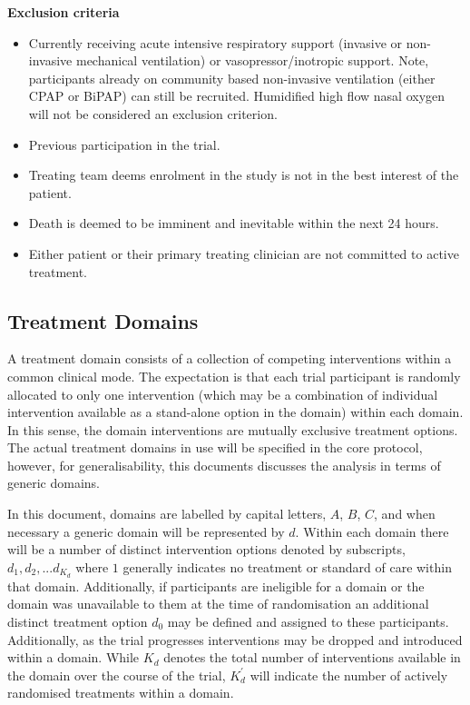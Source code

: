\documentclass[
  11pt,
]{article}
\providecommand{\tightlist}{%
  \setlength{\itemsep}{0pt}\setlength{\parskip}{0pt}}
\begin{document}
\textbf{Exclusion criteria}

\begin{itemize}
\tightlist
\item
  Currently receiving acute intensive respiratory support (invasive or non-invasive mechanical ventilation) or vasopressor/inotropic support. Note, participants already on community based non-invasive ventilation (either CPAP or BiPAP) can still be recruited. Humidified high flow nasal oxygen will not be considered an exclusion criterion.
\item
  Previous participation in the trial.
\item
  Treating team deems enrolment in the study is not in the best interest of the patient.
\item
  Death is deemed to be imminent and inevitable within the next 24 hours.
\item
  Either patient or their primary treating clinician are not committed to active treatment.
\end{itemize}

\hypertarget{treatment-domains}{%
\subsection{Treatment Domains}\label{treatment-domains}}

A treatment domain consists of a collection of competing interventions within a common clinical mode.
The expectation is that each trial participant is randomly allocated to only one intervention (which may be a combination of individual intervention available as a stand-alone option in the domain) within each domain.
In this sense, the domain interventions are mutually exclusive treatment options.
The actual treatment domains in use will be specified in the core protocol, however, for generalisability, this documents discusses the analysis in terms of generic domains.

In this document, domains are labelled by capital letters, \(A\), \(B\), \(C\), and when necessary a generic domain will be represented by \(d\).
Within each domain there will be a number of distinct intervention options denoted by subscripts, \(d_1, d_2,...d_{K_d}\) where \(1\) generally indicates no treatment or standard of care within that domain. Additionally, if participants are ineligible for a domain or the domain was unavailable to them at the time of randomisation an additional distinct treatment option \(d_{0}\) may be defined and assigned to these participants. Additionally, as the trial progresses interventions may be dropped and introduced within a domain. While \(K_d\) denotes the total number of interventions available in the domain over the course of the trial, \(K_d^\prime\) will indicate the number of actively randomised treatments within a domain.
\end{document}

